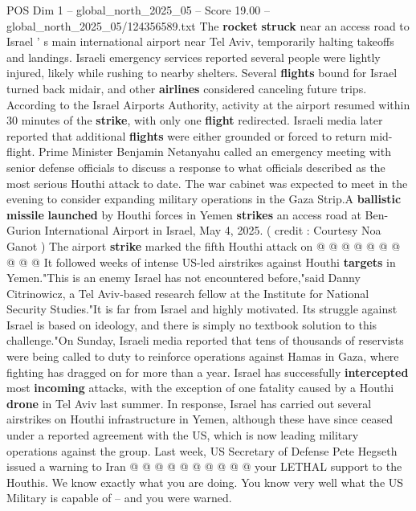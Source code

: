 \begin{textsample}{POS Dim 1 – global\_north\_2025\_05 – Score 19.00 – global\_north\_2025\_05/124356589.txt}  \label{ex:f1_pos_372}
The \textbf{rocket} \textbf{struck} near an access road to Israel ' s main international airport near Tel Aviv, temporarily halting takeoffs and landings.
Israeli emergency services reported several people were lightly injured, likely while rushing to nearby shelters.
Several \textbf{flights} bound for Israel turned back midair, and other \textbf{airlines} considered canceling future trips.
According to the Israel Airports Authority, activity at the airport resumed within 30 minutes of the \textbf{strike}, with only one \textbf{flight} redirected.
Israeli media later reported that additional \textbf{flights} were either grounded or forced to return mid-flight.
Prime Minister Benjamin Netanyahu called an emergency meeting with senior defense officials to discuss a response to what officials described as the most serious Houthi attack to date.
The war cabinet was expected to meet in the evening to consider expanding military operations in the Gaza Strip.A \textbf{ballistic} \textbf{missile} \textbf{launched} by Houthi forces in Yemen \textbf{strikes} an access road at Ben-Gurion International Airport in Israel, May 4, 2025. ( credit : Courtesy Noa Ganot ) The airport \textbf{strike} marked the fifth Houthi attack on @ @ @ @ @ @ @ @ @ @ It followed weeks of intense US-led airstrikes against Houthi \textbf{targets} in Yemen."This is an enemy Israel has not encountered before,"said Danny Citrinowicz, a Tel Aviv-based research fellow at the Institute for National Security Studies."It is far from Israel and highly motivated.
Its struggle against Israel is based on ideology, and there is simply no textbook solution to this challenge."On Sunday, Israeli media reported that tens of thousands of reservists were being called to duty to reinforce operations against Hamas in Gaza, where fighting has dragged on for more than a year.
Israel has successfully \textbf{intercepted} most \textbf{incoming} attacks, with the exception of one fatality caused by a Houthi \textbf{drone} in Tel Aviv last summer.
In response, Israel has carried out several airstrikes on Houthi infrastructure in Yemen, although these have since ceased under a reported agreement with the US, which is now leading military operations against the group.
Last week, US Secretary of Defense Pete Hegseth issued a warning to Iran @ @ @ @ @ @ @ @ @ @ your LETHAL support to the Houthis.
We know exactly what you are doing.
You know very well what the US Military is capable of -- and you were warned.

\end{textsample}
